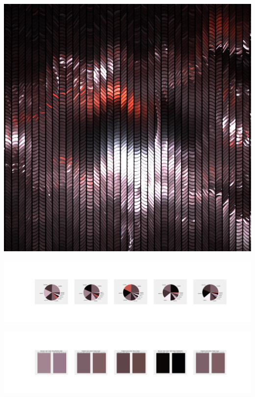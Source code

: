 \documentclass[11pt]{article}
\begin{document}
\begin{landscape}
    \begin{center}
    \includegraphics[width=\textwidth]{./nbimg/file (31).jpg}
    \end{center}

    \begin{center}
    \includegraphics[width=250mm]{./nbimg/pie-234.jpg}
    \end{center}

    \begin{center}
    \includegraphics[width=250mm]{./nbimg/peak-234.jpg}
    \end{center}
    


\end{landscape}
\end{document}
